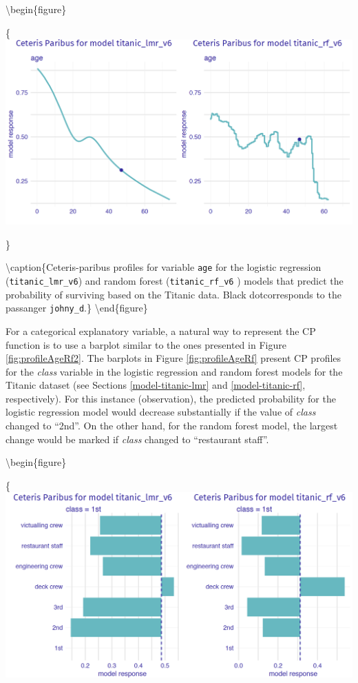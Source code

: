 \documentclass[12pt,]{krantz}
\begin{document}
\textbackslash{}begin\{figure\}

\{\centering \includegraphics[width=0.7\linewidth]{figure/profile_age_rf}

\}

\textbackslash{}caption\{Ceteris-paribus profiles for variable \texttt{age} for the logistic regression (\texttt{titanic\_lmr\_v6}) and random forest (\texttt{titanic\_rf\_v6} ) models that predict the probability of surviving based on the Titanic data. Black dotcorresponds to the passanger \texttt{johny\_d}.\}\label{fig:profileAgeRf}
\textbackslash{}end\{figure\}

For a categorical explanatory variable, a natural way to represent the CP function is to use a barplot similar to the ones presented in Figure \ref{fig:profileAgeRf2}. The barplots in Figure \ref{fig:profileAgeRf} present CP profiles for the \emph{class} variable in the logistic regression and random forest models for the Titanic dataset (see Sections \ref{model-titanic-lmr} and \ref{model-titanic-rf}, respectively). For this instance (observation), the predicted probability for the logistic regression model would decrease substantially if the value of \emph{class} changed to ``2nd''. On the other hand, for the random forest model, the largest change would be marked if \emph{class} changed to ``restaurant staff''.

\textbackslash{}begin\{figure\}

\{\centering \includegraphics[width=0.7\linewidth]{figure/profile_class_rf}
\end{document}
